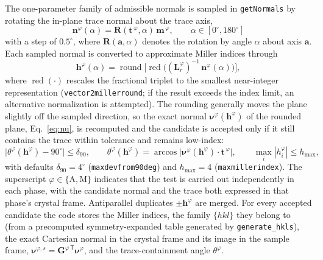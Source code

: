 \documentclass[11pt,a4paper]{article}
\newcommand{\mat}[1]{\mathbf{#1}}
\newcommand{\vc}[1]{\bm{#1}}
\begin{document}
The one-parameter family of admissible normals is sampled in \texttt{getNormals} by rotating the in-plane trace normal about the trace axis,
\begin{equation}
\vc n^{\varphi}(\alpha)=\mat R(\vc t^{\,\varphi},\alpha)\,\vc m^{\,\varphi},
\qquad \alpha \in [0^\circ,180^\circ]
\label{eq:family}
\end{equation}
with a step of $0.5^\circ$, where $\mat R(\vc a,\alpha)$ denotes the rotation by angle $\alpha$ about axis $\vc a$. Each sampled normal is converted to approximate Miller indices through
\begin{equation}
\vc h^{\varphi}(\alpha)=\operatorname{round}\!\Big[\operatorname{red}\big((\mat{L}_{r}^{\varphi})^{-1}\,\vc n^{\varphi}(\alpha)\big)\Big],
\label{eq:miller}
\end{equation}
where $\operatorname{red}(\cdot)$ rescales the fractional triplet to the smallest near-integer representation (\texttt{vector2millerround}; if the result exceeds the index limit, an alternative normalization is attempted). The rounding generally moves the plane slightly off the sampled direction, so the exact normal $\vc \nu^{\varphi}(\vc h^{\varphi})$ of the rounded plane, Eq.~\eqref{eq:nu}, is recomputed and the candidate is accepted only if it still contains the trace within tolerance and remains low-index:
\begin{equation}
\big|\theta^{\varphi}(\vc h^{\varphi})-90^\circ\big|\le \delta_{90},
\qquad
\theta^{\varphi}(\vc h^{\varphi})=\arccos\big|\vc\nu^{\varphi}(\vc h^{\varphi})\cdot\vc t^{\,\varphi}\big|,
\qquad
\max_i |h^{\varphi}_i|\le h_{\max},
\label{eq:accept}
\end{equation}
with defaults $\delta_{90}=4^\circ$ (\texttt{maxdevfrom90deg}) and $h_{\max}=4$ (\texttt{maxmillerindex}). The superscript $\varphi\in\{\mathrm A,\mathrm M\}$ indicates that the test is carried out independently in each phase, with the candidate normal and the trace both expressed in that phase's crystal frame. Antiparallel duplicates $\pm\vc h^{\varphi}$ are merged. For every accepted candidate the code stores the Miller indices, the family $\{hkl\}$ they belong to (from a precomputed symmetry-expanded table generated by \texttt{generate\_hkls}), the exact Cartesian normal in the crystal frame and its image in the sample frame, $\vc \nu^{\varphi,s}=\mat{G}^{\varphi\,\mathsf T}\vc\nu^{\varphi}$, and the trace-containment angle $\theta^{\varphi}$.
\end{document}
